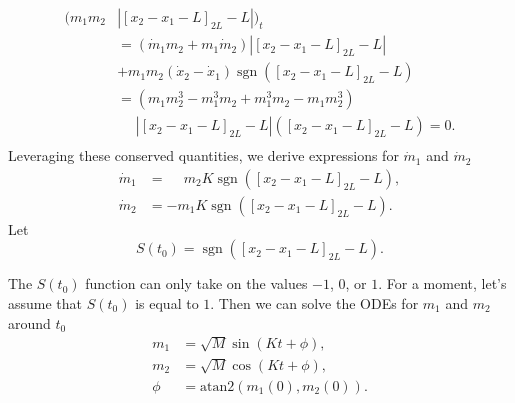 \documentclass[english,master]{liumaiex}
\theoremstyle{plain}
\theoremstyle{definition}
\DeclareMathOperator{\sgn}{sgn}
\begin{document}
\begin{equation}
\begin{aligned}
	(m_1m_2&|[x_2 - x_1 - L]_{2L} - L|)_t \\
	&= (\dot{m}_1m_2 + m_1\dot{m}_2)|[x_2 - x_1 - L]_{2L} - L| \\
	&+ m_1m_2(\dot{x}_2 - \dot{x}_1)\sgn([x_2 - x_1 - L]_{2L} - L) \\
	&=(m_1m_2^3 - m_1^3m_2 + m_1^3m_2 - m_1m_2^3)\\
	&\phantom{=}|[x_2 - x_1 - L]_{2L} - L|([x_2 - x_1 - L]_{2L} - L) =0. \\
\end{aligned}
\end{equation}
%
Leveraging these conserved quantities, we derive expressions for $\dot{m}_1$ and $\dot{m}_2$
\begin{equation}
\begin{aligned}
    \dot{m}_1 &= \phantom{-}m_2K \sgn([x_2 - x_1 - L]_{2L} - L), \\
    \dot{m}_2 &= -m_1K \sgn([x_2 - x_1 - L]_{2L} - L).
\end{aligned}
\end{equation}
%
Let
\begin{equation}
    S(t_0) = \sgn([x_2 - x_1 - L]_{2L} - L).
\end{equation}

The $S(t_0)$ function can only take on the values $-1$, $0$, or $1$. For a moment, let's assume that $S(t_0)$ is equal to $1$. Then we can solve the ODEs for $m_1$ and $m_2$ around $t_0$
\begin{equation}
\begin{aligned}
    m_1 &= \sqrt{M} \sin(K t + \phi), \\
    m_2 &= \sqrt{M} \cos(K t + \phi), \\
    \phi &= \text{atan2}(m_1(0),m_2(0)).
\end{aligned}
\end{equation}
\end{document}
